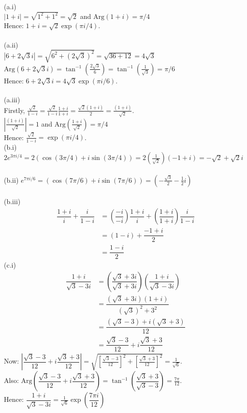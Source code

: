 \documentclass[12pt,a4paper]{article}
\begin{document}
(a.i) \\
$|1 + i| = \sqrt{1^2 + 1^2} = \sqrt{2}$ and $\text{Arg}(1+i) = \pi / 4$ \\
Hence: $1 + i = \sqrt{2} \exp(\pi i/4)$. \\
\\
(a.ii) \\
$\left|6 + 2\sqrt{3} i\right| = \sqrt{6^2 + (2\sqrt{3})^2} = \sqrt{36+12} = 4\sqrt{3}$ \\
$\text{Arg}(6 + 2\sqrt{3} i) = \tan^{-1}(\frac{2\sqrt{3}}{6}) = \tan^{-1}(\frac{1}{\sqrt{3}}) = \pi/6$ \\
Hence: $6 + 2\sqrt{3} i = 4\sqrt{3} \exp(\pi i/6)$.\\
\\
(a.iii) \\
Firstly, $\frac{\sqrt{2}}{1-i} = \frac{\sqrt{2}}{1-i}\frac{1+i}{1+i} = \frac{\sqrt{2}(1+i)}{2} = \frac{(1+i)}{\sqrt{2}}$.\\
$\left|\frac{(1+i)}{\sqrt{2}}\right| = 1$ and $\text{Arg}(\frac{1+i}{\sqrt{2}}) = \pi / 4$ \\
Hence: $\frac{\sqrt{2}}{1-i} = \exp(\pi i/4)$. \\

\newpage
\noindent
(b.i) $2e^{3\pi i/4} = 2(\cos{(3\pi/4)} + i \sin{(3\pi/4)}) = 2(\frac{1}{\sqrt{2}})(-1 + i) = -\sqrt{2} + \sqrt{2} i$ \\
\\
(b.ii) $e^{7\pi i/6} = (\cos{(7\pi/6)} + i \sin{(7\pi/6)}) = (-\frac{\sqrt{3}}{2} - \frac{1}{2} i)$ \\
\\
(b.iii)
\begin{align*}
  \dfrac{1+i}{i}+\dfrac{i}{1-i} &= \left(\dfrac{-i}{-i}\right) \dfrac{1+i}{i} + \left(\dfrac{1+i}{1+i}\right) \dfrac{i}{1-i} \\
  &= (1-i) + \dfrac{-1+i}{2} \\
  &= \dfrac{1-i}{2}
\end{align*}
(c.i)
\begin{align*}
\dfrac{1+i}{\sqrt{3}-3i}
&= \left(\dfrac{\sqrt{3}+3i}{\sqrt{3}+3i}\right)\left(\dfrac{1+i}{\sqrt{3}-3i}\right) \\
&= \dfrac{(\sqrt{3}+3i)(1+i)}{(\sqrt{3})^2+3^2} \\
&= \dfrac{(\sqrt{3}-3)+i(\sqrt{3}+3)}{12} \\
&= \dfrac{\sqrt{3}-3}{12}+i\dfrac{\sqrt{3}+3}{12} 
\end{align*}
Now: $\left| \dfrac{\sqrt{3}-3}{12}+i\dfrac{\sqrt{3}+3}{12} \right| = \sqrt{[\frac{\sqrt{3}-3}{12}]^2 + [\frac{\sqrt{3}+3}{12}]^2}= \frac{1}{\sqrt{6}}$.\\
Also: $\text{Arg}(\dfrac{\sqrt{3}-3}{12}+i\dfrac{\sqrt{3}+3}{12})=\tan^{-1}\left(\dfrac{\sqrt{3}+3}{\sqrt{3}-3}\right)= \frac{7\pi}{12}$.\\
Hence: $\dfrac{1+i}{\sqrt{3}-3i} = \frac{1}{\sqrt{6}} \exp{\left(\dfrac{7\pi i}{12}\right)}$\\
\end{document}
